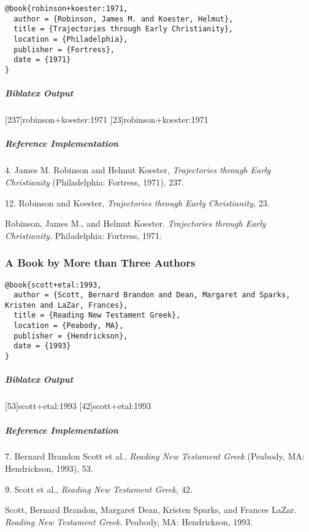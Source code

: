 \documentclass[a4paper]{article}
\newenvironment{biboutput}{%
  \subparagraph{Biblatex Output}
}{\color{black}}
\newenvironment{refimp}{%
  \subparagraph{Reference Implementation}
  \color{reference-colour}
  \rm
}{\par\color{black}}
\begin{document}
\begin{lstlisting}
@book{robinson+koester:1971,
  author = {Robinson, James M. and Koester, Helmut},
  title = {Trajectories through Early Christianity},
  location = {Philadelphia},
  publisher = {Fortress},
  date = {1971}
}
\end{lstlisting}  

\begin{biboutput}
  [237]{robinson+koester:1971}
  [23]{robinson+koester:1971}
\end{biboutput}

\begin{refimp}
  4. James M. Robinson and Helmut Koester, \emph{Trajectories through Early
  Christianity} (Philadelphia: Fortress, 1971), 237.

  12. Robinson and Koester, \emph{Trajectories through Early Christianity,}
  23.

  \hangindent\bibindent Robinson, James M., and Helmut Koester. \emph{Trajectories
  through Early Christianity.} Philadelphia: Fortress, 1971.
\end{refimp}

\subsubsection{A Book by More than Three Authors}

\begin{lstlisting}
@book{scott+etal:1993,
  author = {Scott, Bernard Brandon and Dean, Margaret and Sparks, Kristen and LaZar, Frances},
  title = {Reading New Testament Greek},
  location = {Peabody, MA},
  publisher = {Hendrickson},
  date = {1993}
}
\end{lstlisting}  

\begin{biboutput}
  [53]{scott+etal:1993}
  [42]{scott+etal:1993}
\end{biboutput}

\begin{refimp}
  7. Bernard Brandon Scott et al., \emph{Reading New Testament Greek} (Peabody, MA:
  Hendrickson, 1993), 53.
  
  9. Scott et al., \emph{Reading New Testament Greek,} 42.

  \hangindent\bibindent Scott, Bernard Brandon, Margaret Dean, Kristen Sparks,
  and Frances LaZar. \emph{Reading New Testament Greek.} Peabody, MA:
  Hendrickson, 1993.
\end{refimp}
\end{document}
